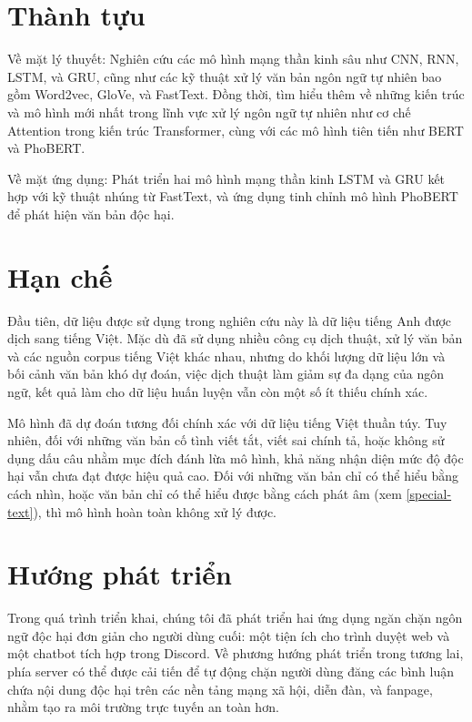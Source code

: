 \section*{Thành tựu}
Về mặt lý thuyết: Nghiên cứu các mô hình mạng thần kinh sâu như CNN, RNN, LSTM, và GRU, cũng như các kỹ thuật xử lý văn bản ngôn ngữ tự nhiên bao gồm Word2vec, GloVe, và FastText. Đồng thời, tìm hiểu thêm về những kiến trúc và mô hình mới nhất trong lĩnh vực xử lý ngôn ngữ tự nhiên như cơ chế Attention trong kiến trúc Transformer, cùng với các mô hình tiên tiến như BERT và PhoBERT.

Về mặt ứng dụng: Phát triển hai mô hình mạng thần kinh LSTM và GRU kết hợp với kỹ thuật nhúng từ FastText, và ứng dụng tinh chỉnh mô hình PhoBERT để phát hiện văn bản độc hại.

\section*{Hạn chế}
Đầu tiên, dữ liệu được sử dụng trong nghiên cứu này là dữ liệu tiếng Anh được dịch sang tiếng Việt. Mặc dù đã sử dụng nhiều công cụ dịch thuật, xử lý văn bản và các nguồn corpus tiếng Việt khác nhau, nhưng do khối lượng dữ liệu lớn và bối cảnh văn bản khó dự đoán, việc dịch thuật làm giảm sự đa dạng của ngôn ngữ, kết quả làm cho dữ liệu huấn luyện vẫn còn một số ít thiếu chính xác.

Mô hình đã dự đoán tương đối chính xác với dữ liệu tiếng Việt thuần túy. Tuy nhiên, đối với những văn bản cố tình viết tắt, viết sai chính tả, hoặc không sử dụng dấu câu nhằm mục đích đánh lừa mô hình, khả năng nhận diện mức độ độc hại vẫn chưa đạt được hiệu quả cao. Đối với những văn bản chỉ có thể hiểu bằng cách nhìn, hoặc văn bản chỉ có thể hiểu được bằng cách phát âm (xem \ref{special-text}), thì mô hình hoàn toàn không xử lý được.

\section*{Hướng phát triển}
Trong quá trình triển khai, chúng tôi đã phát triển hai ứng dụng ngăn chặn ngôn ngữ độc hại đơn giản cho người dùng cuối: một tiện ích cho trình duyệt web và một chatbot tích hợp trong Discord. Về phương hướng phát triển trong tương lai, phía server có thể được cải tiến để tự động chặn người dùng đăng các bình luận chứa nội dung độc hại trên các nền tảng mạng xã hội, diễn đàn, và fanpage, nhằm tạo ra môi trường trực tuyến an toàn hơn.